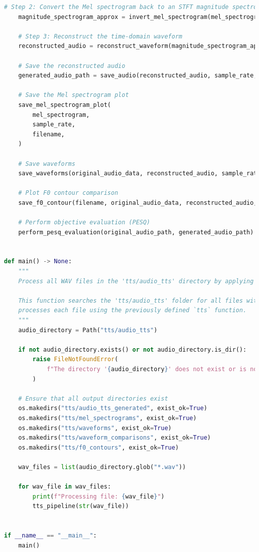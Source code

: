 \documentclass[12pt]{article}
\begin{document}
\begin{lstlisting}[language=Python, basicstyle=\fontsize{8}{9}\ttfamily]
    # Step 2: Convert the Mel spectrogram back to an STFT magnitude spectrogram
    magnitude_spectrogram_approx = invert_mel_spectrogram(mel_spectrogram, sample_rate)

    # Step 3: Reconstruct the time-domain waveform
    reconstructed_audio = reconstruct_waveform(magnitude_spectrogram_approx)

    # Save the reconstructed audio
    generated_audio_path = save_audio(reconstructed_audio, sample_rate, filename)

    # Save the Mel spectrogram plot
    save_mel_spectrogram_plot(
        mel_spectrogram,
        sample_rate,
        filename,
    )

    # Save waveforms
    save_waveforms(original_audio_data, reconstructed_audio, sample_rate, filename)

    # Plot F0 contour comparison
    save_f0_contour(filename, original_audio_data, reconstructed_audio, sample_rate)

    # Perform objective evaluation (PESQ)
    perform_pesq_evaluation(original_audio_path, generated_audio_path)


def main() -> None:
    """
    Process all WAV files in the 'tts/audio_tts' directory by applying the tts function to each file.

    This function searches the 'tts/audio_tts' folder for all files with a '.wav' extension and
    processes each file using the previously defined `tts` function.
    """
    audio_directory = Path("tts/audio_tts")

    if not audio_directory.exists() or not audio_directory.is_dir():
        raise FileNotFoundError(
            f"The directory '{audio_directory}' does not exist or is not a directory."
        )

    # Ensure that all output directories exist
    os.makedirs("tts/audio_tts_generated", exist_ok=True)
    os.makedirs("tts/mel_spectrograms", exist_ok=True)
    os.makedirs("tts/waveforms", exist_ok=True)
    os.makedirs("tts/waveform_comparisons", exist_ok=True)
    os.makedirs("tts/f0_contours", exist_ok=True)

    wav_files = list(audio_directory.glob("*.wav"))

    for wav_file in wav_files:
        print(f"Processing file: {wav_file}")
        tts_pipeline(str(wav_file))


if __name__ == "__main__":
    main()
\end{lstlisting}
\end{document}
